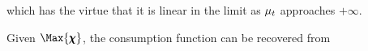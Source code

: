   which has the virtue that it is linear in the limit as $\mu_{t}$ approaches $+\infty$.

  Given $\Max{\chiFunc}$, the consumption function can be recovered from
